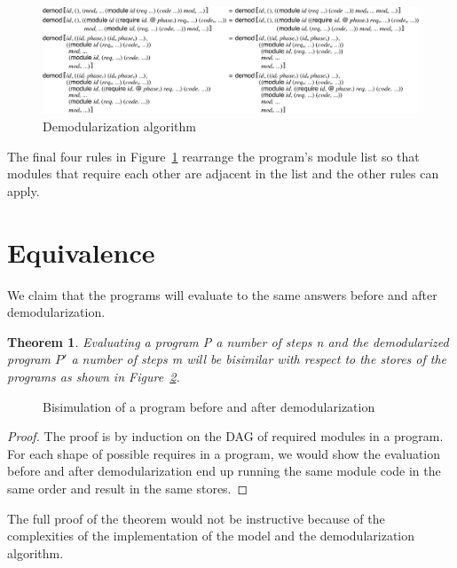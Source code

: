 \begin{figure}[!h]
\includegraphics[width=\textwidth]{figures/demod-redex3}
\caption{Demodularization algorithm}
\label{fig:demod-redex3}
\end{figure}

The final four rules in Figure~\ref{fig:demod-redex3} rearrange the program's module list so that modules that require each other are adjacent in the list and the other rules can apply.

\section{Equivalence}
We claim that the programs will evaluate to the same answers before and after demodularization. 

\newtheorem*{theorem}{Theorem}
\begin{theorem}
Evaluating a program P a number of steps n and the demodularized program $P'$ a number of steps m will be bisimilar with respect to the stores of the programs as shown in Figure~\ref{fig:bisim.tex}.
\end{theorem}

\begin{figure}[h]
  \centering
  
  \caption{Bisimulation of a program before and after demodularization}
  \label{fig:bisim.tex}
\end{figure}

\begin{proof}
The proof is by induction on the DAG of required modules in a program.
For each shape of possible requires in a program, we would show the evaluation before and after demodularization end up running the same module code in the same order and result in the same stores.
\end{proof}

The full proof of the theorem would not be instructive because of the complexities of the implementation of the model and the demodularization algorithm.

